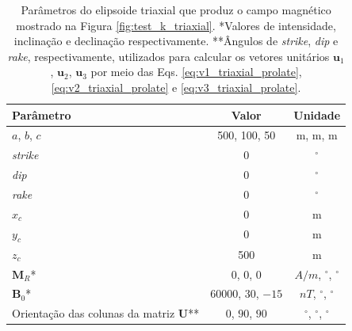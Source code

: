 \begin{table}[h!]
	\begin{center}
		\begin{tabular}{|l|c|c|}
			\hline
			\textbf{Parâmetro}  & \textbf{Valor} & \textbf{Unidade} \\
			\hline 
			$a$, $b$, $c$   & 500, 100, 50 & m, m, m\\
			\hline
			\textit{strike}   & $0$ & $^{\circ}$\\
			\hline
			\textit{dip}   & $0$ & $^{\circ}$\\
			\hline
			\textit{rake}   & $0$  & $^{\circ}$\\
			\hline
			$x_c$   & 0  & m\\
			\hline          
			$y_c$   & 0  & m\\
			\hline                
			$z_c$   & 500 & m \\
			\hline
			$\mathbf{M}_{R}$*  & 0, $0$, $0$ & $A/m$, $^{\circ}$, $^{\circ}$ \\
			\hline
			$\mathbf{B}_{0}$*    & 60000, $30$, $-15$ & $nT$, $^{\circ}$, $^{\circ}$ \\
			\hline
			Orientação das colunas da matriz $\mathbf{U}$**  & $0$, $90$, $90$ & $^{\circ}$, $^{\circ}$, $^{\circ}$ \\
			\hline
		\end{tabular}
		\caption{Parâmetros do elipsoide triaxial que produz o campo magnético mostrado na Figura \ref{fig:test_k_triaxial}. *Valores de intensidade, inclinação e declinação respectivamente. **Ângulos de \textit{strike}, \textit{dip}  e \textit{rake}, respectivamente, utilizados para calcular os vetores unitários $\mathbf{u}_{1}$, $\mathbf{u}_{2}$, $\mathbf{u}_{3}$ por meio das Eqs. \ref{eq:v1_triaxial_prolate}, \ref{eq:v2_triaxial_prolate} e \ref{eq:v3_triaxial_prolate}.}
	\end{center}
	\label{tab:triaxial_k_iso}
\end{table}

